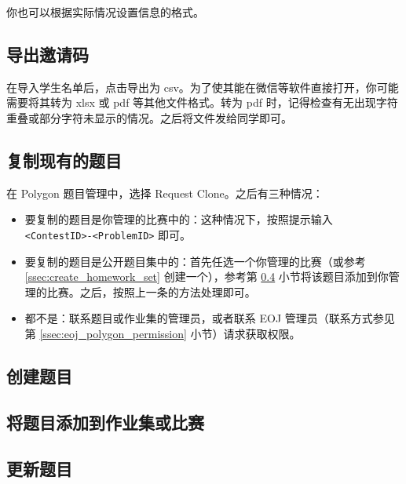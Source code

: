 \documentclass[oneside]{book}
\begin{document}
你也可以根据实际情况设置信息的格式。

\subsection{导出邀请码}

\label{ssec:export_inviting_code}

在导入学生名单后，点击导出为 csv。为了使其能在微信等软件直接打开，你可能需要将其转为 xlsx 或 pdf 等其他文件格式。转为 pdf 时，记得检查有无出现字符重叠或部分字符未显示的情况。之后将文件发给同学即可。

\subsection{复制现有的题目}

\label{ssec:copy_exist_problem}

在 Polygon 题目管理中，选择 Request Clone。之后有三种情况：

\begin{itemize}
  \item 要复制的题目是你管理的比赛中的：这种情况下，按照提示输入 \lstinline{<ContestID>-<ProblemID>} 即可。
  \item 要复制的题目是公开题目集中的：首先任选一个你管理的比赛（或参考 \ref{ssec:create_homework_set} 创建一个），参考第 \ref{ssec:add_problem_to_homework_set} 小节将该题目添加到你管理的比赛。之后，按照上一条的方法处理即可。
  \item 都不是：联系题目或作业集的管理员，或者联系 EOJ 管理员（联系方式参见第 \ref{ssec:eoj_polygon_permission} 小节）请求获取权限。
\end{itemize}

\subsection{创建题目}

\label{ssec:create_new}

\subsection{将题目添加到作业集或比赛}

\label{ssec:add_problem_to_homework_set}

\subsection{更新题目}

\label{ssec:update_problem}
\end{document}
